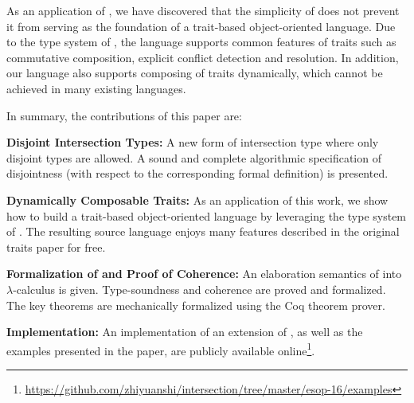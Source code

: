 As an application of \name, we have discovered that the simplicity of \name does
not prevent it from serving as the foundation of a trait-based object-oriented
language. Due to the type system of \name, the language supports common features
of traits such as commutative composition, explicit conflict detection and
resolution. In addition, our language also supports composing of traits
dynamically, which cannot be achieved in many existing languages.

In summary, the contributions of this paper are:

\begin{itemize*}

\item \textbf{Disjoint Intersection Types:} A new form of intersection type
where only disjoint types are allowed. A sound and complete algorithmic
specification of disjointness (with respect to the corresponding formal
definition) is presented.

\item \textbf{Dynamically Composable Traits:} As an application of this work, we show how to build a
trait-based object-oriented language by leveraging the type system of \name. The
resulting source language enjoys many features described in the original traits
paper for free.

\item \textbf{Formalization of \name and Proof of Coherence:} An
   elaboration semantics of \name into $\lambda$-calculus is
   given. Type-soundness and coherence are proved and formalized. The key theorems
   are mechanically formalized using the Coq theorem prover.

\item \textbf{Implementation:} An implementation of an extension of \name, as
well as the examples presented in the paper, are publicly available
online\footnote{
\url{https://github.com/zhiyuanshi/intersection/tree/master/esop-16/examples}}.

\end{itemize*}


